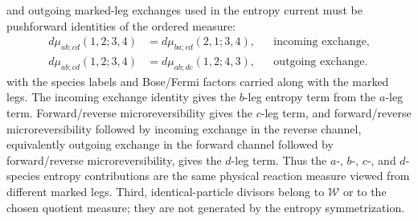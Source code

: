 and outgoing marked-leg exchanges used in the entropy current must be
pushforward identities of the ordered measure:
\begin{equation}
\begin{aligned}
  d\mu_{ab;cd}(1,2;3,4)
  &=
  d\mu_{ba;cd}(2,1;3,4),
  &&\text{incoming exchange,}
  \\
  d\mu_{ab;cd}(1,2;3,4)
  &=
  d\mu_{ab;dc}(1,2;4,3),
  &&\text{outgoing exchange.}
\end{aligned}
  \label{eq:kinetic-leg-exchange-pushforwards}
\end{equation}
with the species labels and Bose/Fermi factors carried along with the marked
legs.  The incoming exchange identity gives the \(b\)-leg entropy term from the
\(a\)-leg term.  Forward/reverse microreversibility gives the \(c\)-leg term,
and forward/reverse microreversibility followed by incoming exchange in the
reverse channel, equivalently outgoing exchange in the forward channel followed
by forward/reverse microreversibility, gives the \(d\)-leg term.  Thus the
\(a\)-, \(b\)-, \(c\)-, and \(d\)-species entropy contributions are the same
physical reaction measure viewed from different marked legs.  Third,
identical-particle divisors belong to \(\mathcal W\) or to the chosen quotient
measure; they are not generated by the entropy symmetrization.

